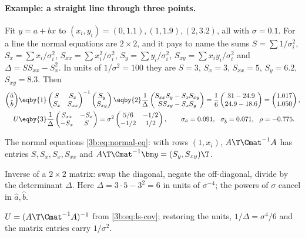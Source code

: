 \paragraph{Example: a straight line through three points.}
Fit $y=a+bx$ to $(x_i,y_i)=(0,1.1),(1,1.9),(2,3.2)$, all with $\sigma=0.1$.
For a line the normal equations are $2\times2$, and it pays to name the sums
$S=\sum1/\sigma_i^2$, $S_x=\sum x_i/\sigma_i^2$, $S_{xx}=\sum x_i^2/\sigma_i^2$,
$S_y=\sum y_i/\sigma_i^2$, $S_{xy}=\sum x_iy_i/\sigma_i^2$ and
$\Delta=SS_{xx}-S_x^2$. In units of $1/\sigma^2=100$ they are $S=3$,
$S_x=3$, $S_{xx}=5$, $S_y=6.2$, $S_{xy}=8.3$. Then
\begin{align*}
  \begin{pmatrix}\hat a\\ \hat b\end{pmatrix}
  &\eqby{1}\begin{pmatrix}S&S_x\\ S_x&S_{xx}\end{pmatrix}^{-1}
    \begin{pmatrix}S_y\\ S_{xy}\end{pmatrix}
  \eqby{2}\frac1\Delta\begin{pmatrix}S_{xx}S_y-S_xS_{xy}\\ SS_{xy}-S_xS_y\end{pmatrix}
  =\frac16\begin{pmatrix}31-24.9\\ 24.9-18.6\end{pmatrix}
  =\begin{pmatrix}1.017\\ 1.050\end{pmatrix},\\
  U&\eqby{3}\frac1\Delta\begin{pmatrix}S_{xx}&-S_x\\ -S_x&S\end{pmatrix}
  =\sigma^2\begin{pmatrix}5/6&-1/2\\ -1/2&1/2\end{pmatrix},
  \qquad
  \sigma_{\hat a}=0.091,\ \ \sigma_{\hat b}=0.071,\ \ \rho=-0.775 .
\end{align*}
\begin{explain}
  \item The normal equations \eqref{3b:eq:normal-eq}: with rows $(1,x_i)$,
        $A\T\Cmat^{-1}A$ has entries $S,S_x,S_x,S_{xx}$ and
        $A\T\Cmat^{-1}\bm y=(S_y,S_{xy})\T$.
  \item Inverse of a $2\times2$ matrix: swap the diagonal, negate the
        off-diagonal, divide by the determinant $\Delta$. Here
        $\Delta=3\cdot5-3^2=6$ in units of $\sigma^{-4}$; the powers of
        $\sigma$ cancel in $\hat a,\hat b$.
  \item $U=(A\T\Cmat^{-1}A)^{-1}$ from \eqref{3b:eq:ls-cov}; restoring the
        units, $1/\Delta=\sigma^4/6$ and the matrix entries carry
        $1/\sigma^2$.
\end{explain}
